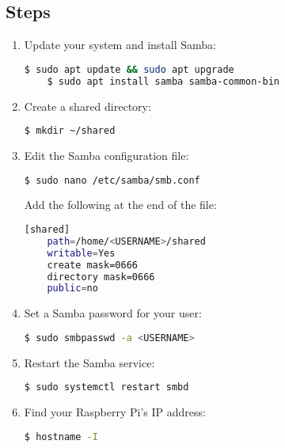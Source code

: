 \subsection{Steps}
\begin{enumerate}
    \item Update your system and install Samba:
    \begin{lstlisting}[language=bash, breaklines=true, breakatwhitespace=true, columns=fullflexible]
    $ sudo apt update && sudo apt upgrade
    $ sudo apt install samba samba-common-bin
    \end{lstlisting}

    \item Create a shared directory:
    \begin{lstlisting}[language=bash, breaklines=true, breakatwhitespace=true, columns=fullflexible]
    $ mkdir ~/shared
    \end{lstlisting}

    \item Edit the Samba configuration file:
    \begin{lstlisting}[language=bash, breaklines=true, breakatwhitespace=true, columns=fullflexible]
    $ sudo nano /etc/samba/smb.conf
    \end{lstlisting}
    Add the following at the end of the file:
    \begin{lstlisting}[language=bash, breaklines=true, breakatwhitespace=true, columns=fullflexible]
    [shared]
    path=/home/<USERNAME>/shared
    writable=Yes
    create mask=0666
    directory mask=0666
    public=no
    \end{lstlisting}

    \item Set a Samba password for your user:
    \begin{lstlisting}[language=bash, breaklines=true, breakatwhitespace=true, columns=fullflexible]
    $ sudo smbpasswd -a <USERNAME>
    \end{lstlisting}

    \item Restart the Samba service:
    \begin{lstlisting}[language=bash, breaklines=true, breakatwhitespace=true, columns=fullflexible]
    $ sudo systemctl restart smbd
    \end{lstlisting}

    \item Find your Raspberry Pi's IP address:
    \begin{lstlisting}[language=bash, breaklines=true, breakatwhitespace=true, columns=fullflexible]
    $ hostname -I
    \end{lstlisting}


\end{enumerate}
